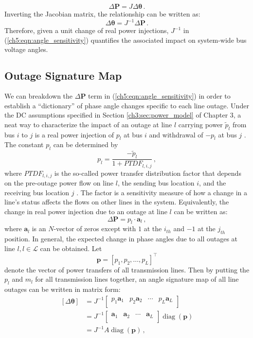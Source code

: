 $$
\Delta\textbf{P} = {J} \Delta\boldsymbol{\theta} \,.
$$
Inverting the Jacobian matrix, the relationship can be written as:
\begin{equation}
\label{ch5:eqn:angle_sensitivity}
\Delta\boldsymbol{\theta}  = {J}^{-1} \Delta\textbf{P} \,.
\end{equation}
Therefore, given a unit change of real power injections, ${J}^{-1}$ in (\ref{ch5:eqn:angle_sensitivity}) quantifies the associated impact on system-wide bus voltage angles. 

\subsection{Outage Signature Map}
\label{ch5:sec:outage_signature_map}
We can breakdown the $\Delta\textbf{P}$ term in (\ref{ch5:eqn:angle_sensitivity}) in order to establish a ``dictionary'' of phase angle changes specific to each line outage. Under the DC assumptions specified in Section \ref{ch3:sec:power_model} of Chapter 3, a neat way to characterize the impact of an outage at line $l$ carrying power $\tilde{p}_l$ from bus $i$ to $j$ is a real power injection of $p_{l}$ at bus $i$ and withdrawal of $-p_{l}$ at bus $j$ \cite{wood2013power}. The constant $p_l$ can be determined by
$$
p_l = \frac{-\tilde{p}_l}{1+PTDF_{l, i, j}} \,,
$$ where $PTDF_{l, i, j}$ is the so-called power transfer distribution factor that depends on the pre-outage power flow on line $l$, the sending bus location $i$, and the receiving bus location $j$ \cite{liu2004role}. The factor is a sensitivity measure of how a change in a line’s status affects the flows on other lines in the system. Equivalently, the change in real power injection due to an outage at line $l$ can be written as:
$$
\Delta \textbf{P} = p_{l} \cdot \mathbf{a}_l \,,
$$ 
where $\mathbf{a}_l$ is an $N$-vector of zeros except with $1$ at the $i_{th}$ and $-1$ at the $j_{th}$ position. In general, the expected change in phase angles due to all outages at line $l, l \in \mathcal{L}$ can be obtained. Let 
$$
\boldsymbol{p} = [p_1, p_2, \dots, p_L]^{\top}
$$
denote the vector of power transfers of all transmission lines. Then by putting the $p_{l}$ and $m_l$ for all transmission lines together, an angle signature map of all line outages can be written in matrix form:
\begin{align}
\label{ch5:eqn:complete_map}
    [\Delta\boldsymbol{\theta}] 
    &= {J}^{-1} 
    \begin{bmatrix} p_{1} \mathbf{a}_{1} & p_{2} \mathbf{a}_{2} & \cdots & p_{L} \mathbf{a}_{L}\\ 
    \end{bmatrix} \nonumber\\ 
    &= {J}^{-1} 
    \begin{bmatrix} \mathbf{a}_{1} & \mathbf{a}_{2} & \cdots & \mathbf{a}_{L} \\
    \end{bmatrix} \operatorname{ diag}(\boldsymbol{p}) \nonumber\\
    &= {J}^{-1} A \operatorname{ diag}(\boldsymbol{p}) \,, 
\end{align}

